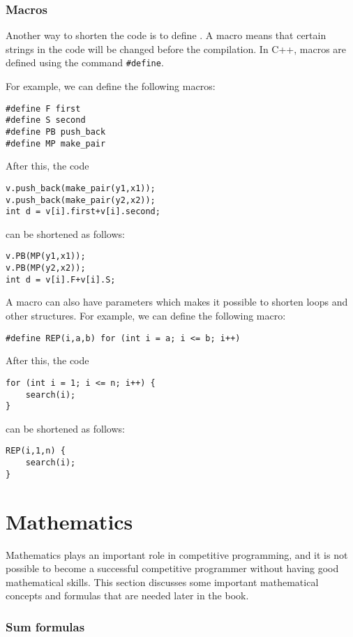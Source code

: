 \subsubsection{Macros}
Another way to shorten the code is to define
.
A macro means that certain strings in
the code will be changed before the compilation.
In C++, macros are defined using the
command \texttt{\#define}.

For example, we can define the following macros:
\begin{lstlisting}
#define F first
#define S second
#define PB push_back
#define MP make_pair
\end{lstlisting}
After this, the code
\begin{lstlisting}
v.push_back(make_pair(y1,x1));
v.push_back(make_pair(y2,x2));
int d = v[i].first+v[i].second;
\end{lstlisting}
can be shortened as follows:
\begin{lstlisting}
v.PB(MP(y1,x1));
v.PB(MP(y2,x2));
int d = v[i].F+v[i].S;
\end{lstlisting}

A macro can also have parameters
which makes it possible to shorten loops and other
structures.
For example, we can define the following macro:
\begin{lstlisting}
#define REP(i,a,b) for (int i = a; i <= b; i++)
\end{lstlisting}
After this, the code
\begin{lstlisting}
for (int i = 1; i <= n; i++) {
    search(i);
}
\end{lstlisting}
can be shortened as follows:
\begin{lstlisting}
REP(i,1,n) {
    search(i);
}
\end{lstlisting}

\section{Mathematics}

Mathematics plays an important role in competitive
programming, and it is not possible to become
a successful competitive programmer without
having good mathematical skills.
This section discusses some important
mathematical concepts and formulas that
are needed later in the book.

\subsubsection{Sum formulas}

